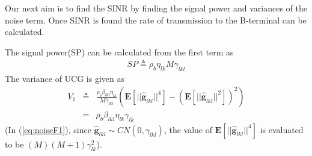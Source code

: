 \documentclass[10pt, a4paper, twoside,fleqn]{article}
\begin{document}
Our next aim is to find the SINR by finding the signal power and variances of the noise term. Once SINR is found the rate of transmission to the B-terminal can be calculated.

The signal power(SP) can be calculated from the first term as
\begin{eqnarray}
	SP %
            \triangleq \rho_b\eta_{lk}M\gamma_{lkl}
\end{eqnarray}
The variance of UCG is given as
\begin{eqnarray}\label{eq:noiseF1}
	V_1 %
	    &\triangleq& \frac{\rho_b \beta_{lkl} \eta_{lk}}{M\gamma_{lkl}}   \left(\pmb{E}[||\pmb{\hat g}_{lkl}||^4] - (\pmb{E}[||\pmb{\hat g}_{lkl}||^2])^2 \right) \nonumber  \\
	    &=& \rho_b\beta_{lkl}\eta_{lk}\gamma_{lk}
\end{eqnarray}
(In (\ref{eq:noiseF1}), since $\pmb{\hat g}_{lkl} \sim CN(0,\gamma_{lkl})$, the value of $\pmb{E}[||\pmb{\hat g}_{lkl}||^4]$ is evaluated to be $(M)(M+1)\gamma_{lk}^2$).
\end{document}
